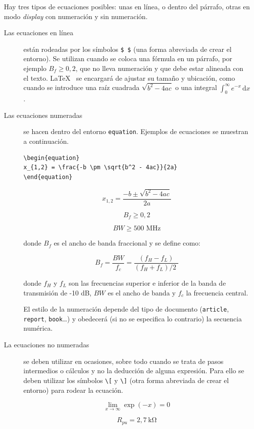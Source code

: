 Hay tres tipos de ecuaciones posibles: unas en línea, o dentro del párrafo, otras en modo \emph{display} con numeración y sin numeración. 

\begin{description}

\item [Las ecuaciones en línea] están rodeadas por los símbolos \verb+$ $+ (una forma abreviada de crear el entorno). Se utilizan cuando se coloca una fórmula en un párrafo, por ejemplo $ {{B}_{f}}\ge 0,2 $, que no lleva numeración y que debe estar alineada con el texto. \LaTeX~ se encargará de ajustar su tamaño y ubicación, como cuando se introduce una raíz cuadrada $ \sqrt {{b^2} - 4ac} $ o una integral  $ \int_0^\infty e^{-x}\,\mathrm{d}x $. 

\item [Las ecuaciones numeradas] se hacen dentro del entorno \texttt{equation}. Ejemplos de ecuaciones se muestran a continuación.

\begin{verbatim}
\begin{equation}
x_{1,2} = \frac{-b \pm \sqrt{b^2 - 4ac}}{2a}
\end{equation}
\end{verbatim}

\begin{equation}
x_{1,2} = \frac{-b \pm \sqrt{b^2 - 4ac}}{2a}
\end{equation}

\begin{equation}\label{E:desigualdad}
{B}_{f}\ge 0,2
\end{equation}

\begin{equation}\label{E:anchodebanda}
BW\ge 500\text{ MHz}
\end{equation}

donde $ {B}_{f} $ es el ancho de banda fraccional y se define como:

\begin{equation}\label{E:fraccional}
{{B}_{f}}=\frac{BW}{{{f}_{c}}}=\frac{\left( {{f}_{H}}-{{f}_{L}} \right)}{{\left( {{f}_{H}}+{{f}_{L}} \right)}/{2}\;}
\end{equation}

donde $f_H$ y $f_L$ son las frecuencias superior e inferior de la banda de transmisión de -10 dB, $ BW $ es el ancho de banda y $f_c$ la frecuencia central.

El estilo de la numeración depende del tipo de documento (\texttt{article}, \texttt{report}, \texttt{book}\ldots) y obedecerá (si no se especifica lo contrario) la secuencia numérica.

\item [La ecuaciones no numeradas] se deben utilizar en ocasiones, sobre todo cuando se trata de pasos intermedios o cálculos y no la deducción de alguna expresión. Para ello se deben utilizar los símbolos \verb+\[+ y \verb+\]+ (otra forma abreviada de crear el entorno) para rodear la ecuación.

\[
 \lim_{x \to \infty} \exp(-x) = 0
\]

\[
 R_{pu} = 2,7~\si{\kilo\ohm}
\]

\end{description}

